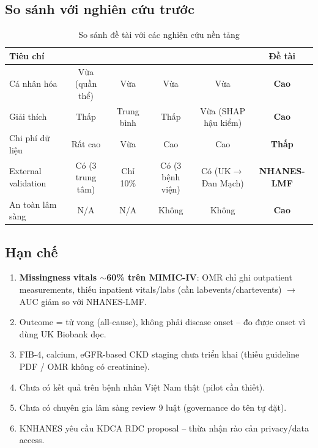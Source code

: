 \documentclass[13pt,a4paper]{article}
\begin{document}
\subsection{So sánh với nghiên cứu trước}

\begin{table}[H]
\centering
\caption{So sánh đề tài với các nghiên cứu nền tảng}
\label{tab:comparison}
\begin{tabular}{lccccc}
\toprule
Tiêu chí & \cite{guo2024} & \cite{swinckels2024} & \cite{kraljevic2024} & \cite{shmatko2025} & \textbf{Đề tài} \\
\midrule
Cá nhân hóa & Vừa (quần thể) & Vừa & Vừa & Vừa & \textbf{Cao} \\
Giải thích & Thấp & Trung bình & Thấp & Vừa (SHAP hậu kiểm) & \textbf{Cao} \\
Chi phí dữ liệu & Rất cao & Vừa & Cao & Cao & \textbf{Thấp} \\
External validation & Có (3 trung tâm) & Chỉ 10\% & Có (3 bệnh viện) & Có (UK$\to$Đan Mạch) & \textbf{NHANES-LMF} \\
An toàn lâm sàng & N/A & N/A & Không & Không & \textbf{Cao} \\
\bottomrule
\end{tabular}
\end{table}

\subsection{Hạn chế}

\begin{enumerate}
    \item \textbf{Missingness vitals $\sim$60\% trên MIMIC-IV}: OMR chỉ ghi outpatient measurements, thiếu inpatient vitals/labs (cần labevents/chartevents) $\to$ AUC giảm so với NHANES-LMF.
    \item Outcome = tử vong (all-cause), không phải disease onset -- \cite{shmatko2025} đo được onset vì dùng UK Biobank dọc.
    \item FIB-4, calcium, eGFR-based CKD staging chưa triển khai (thiếu guideline PDF / OMR không có creatinine).
    \item Chưa có kết quả trên bệnh nhân Việt Nam thật (pilot cần thiết).
    \item Chưa có chuyên gia lâm sàng review 9 luật (governance do tên tự đặt).
    \item KNHANES yêu cầu KDCA RDC proposal -- \cite{shen2025} thừa nhận rào cản privacy/data access.
\end{enumerate}
\end{document}
